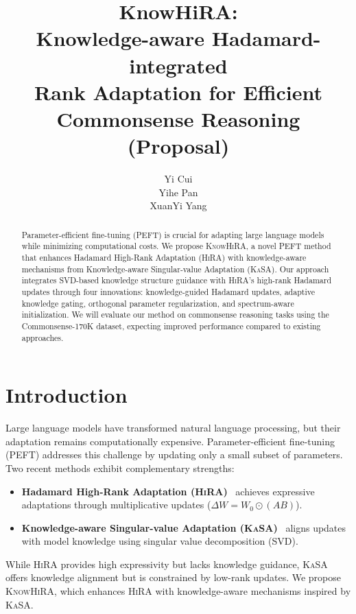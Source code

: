 \documentclass[10pt,letterpaper]{article}
\title{KnowHiRA:\\Knowledge-aware Hadamard-integrated\\Rank Adaptation for Efficient\\Commonsense Reasoning\\(Proposal)}
\author{
    Yi Cui\\
    \And
    Yihe Pan\\
    \And
    XuanYi Yang\\
}
\begin{document}
\maketitle

\begin{abstract}
Parameter-efficient fine-tuning (PEFT) is crucial for adapting large language models while minimizing computational costs. We propose \textsc{KnowHiRA}, a novel PEFT method that enhances Hadamard High-Rank Adaptation (\textsc{HiRA}) with knowledge-aware mechanisms from Knowledge-aware Singular-value Adaptation (\textsc{KaSA}). Our approach integrates SVD-based knowledge structure guidance with \textsc{HiRA}'s high-rank Hadamard updates through four innovations: knowledge-guided Hadamard updates, adaptive knowledge gating, orthogonal parameter regularization, and spectrum-aware initialization. We will evaluate our method on commonsense reasoning tasks using the Commonsense-170K dataset, expecting improved performance compared to existing approaches.
\end{abstract}

\section{Introduction}

Large language models have transformed natural language processing, but their adaptation remains computationally expensive. Parameter-efficient fine-tuning (PEFT) addresses this challenge by updating only a small subset of parameters. Two recent methods exhibit complementary strengths:

\begin{itemize}
    \item \textbf{Hadamard High-Rank Adaptation (\textsc{HiRA})}~\cite{huang2025hira} achieves expressive adaptations through multiplicative updates ($\Delta W = W_0 \odot (AB)$).
    
    \item \textbf{Knowledge-aware Singular-value Adaptation (\textsc{KaSA})}~\cite{wang2024kasa} aligns updates with model knowledge using singular value decomposition (SVD).
\end{itemize}

While \textsc{HiRA} provides high expressivity but lacks knowledge guidance, \textsc{KaSA} offers knowledge alignment but is constrained by low-rank updates. We propose \textsc{KnowHiRA}, which enhances \textsc{HiRA} with knowledge-aware mechanisms inspired by \textsc{KaSA}.
\end{document}
